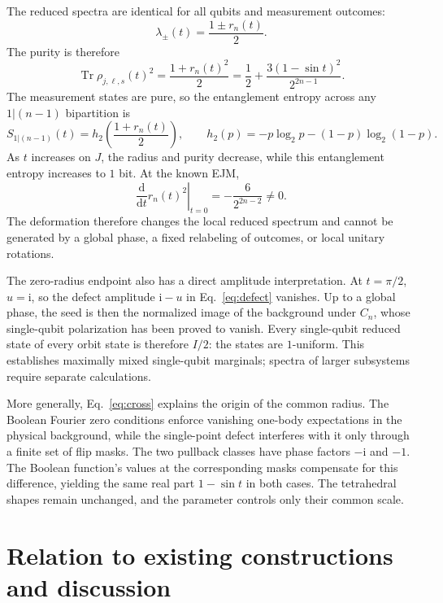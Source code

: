 \documentclass[11pt,a4paper]{article}
\numberwithin{equation}{section}
\theoremstyle{definition}
\newcommand{\ii}{\mathrm i}
\newcommand{\Tr}{\operatorname{Tr}}
\begin{document}
The reduced spectra are identical for all qubits and measurement outcomes:
\begin{equation}
 \lambda_\pm(t)=\frac{1\pm r_n(t)}2.
 \label{eq:spectrum}
\end{equation}
The purity is therefore
\begin{equation}
 \Tr\rho_{j,\ell,s}(t)^2
 =\frac{1+r_n(t)^2}{2}
 =\frac12+\frac{3(1-\sin t)^2}{2^{2n-1}}.
 \label{eq:purity}
\end{equation}
The measurement states are pure, so the entanglement entropy across any $1|(n-1)$ bipartition is
\begin{equation}
 S_{1|(n-1)}(t)=h_2\left(\frac{1+r_n(t)}2\right),\qquad
 h_2(p)=-p\log_2p-(1-p)\log_2(1-p).
 \label{eq:entropy}
\end{equation}
As $t$ increases on $J$, the radius and purity decrease, while this entanglement entropy increases to $1$ bit. At the known EJM,
\begin{equation}
 \left.\frac{\mathrm d}{\mathrm dt}r_n(t)^2\right|_{t=0}
 =-\frac6{2^{2n-2}}\ne0.
\end{equation}
The deformation therefore changes the local reduced spectrum and cannot be generated by a global phase, a fixed relabeling of outcomes, or local unitary rotations.

The zero-radius endpoint also has a direct amplitude interpretation. At $t=\pi/2$, $u=\ii$, so the defect amplitude $\ii-u$ in Eq.~\eqref{eq:defect} vanishes. Up to a global phase, the seed is then the normalized image of the background under $C_n$, whose single-qubit polarization has been proved to vanish. Every single-qubit reduced state of every orbit state is therefore $I/2$: the states are $1$-uniform. This establishes maximally mixed single-qubit marginals; spectra of larger subsystems require separate calculations.

More generally, Eq.~\eqref{eq:cross} explains the origin of the common radius. The Boolean Fourier zero conditions enforce vanishing one-body expectations in the physical background, while the single-point defect interferes with it only through a finite set of flip masks. The two pullback classes have phase factors $-\ii$ and $-1$. The Boolean function's values at the corresponding masks compensate for this difference, yielding the same real part $1-\sin t$ in both cases. The tetrahedral shapes remain unchanged, and the parameter controls only their common scale.

\section{Relation to existing constructions and discussion}
\label{sec:discussion}
\end{document}
